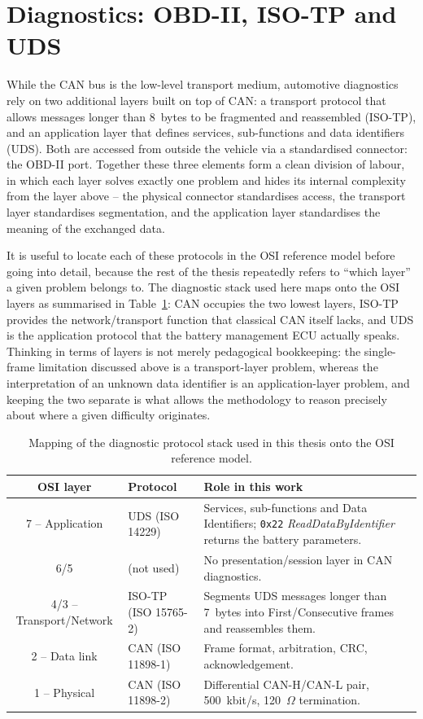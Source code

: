 \documentclass[11pt,a4paper,oneside,parskip=half]{scrreprt}
\providecommand{\hex}{}\renewcommand{\hex}[1]{\texttt{0x#1}}
\begin{document}
\section{Diagnostics: OBD-II, ISO-TP and UDS}
While the CAN bus is the low-level transport medium, automotive diagnostics rely on two additional layers built on top of CAN: a transport protocol that allows messages longer than 8~bytes to be fragmented and reassembled (ISO-TP), and an application layer that defines services, sub-functions and data identifiers (UDS). Both are accessed from outside the vehicle via a standardised connector: the OBD-II port. Together these three elements form a clean division of labour, in which each layer solves exactly one problem and hides its internal complexity from the layer above -- the physical connector standardises access, the transport layer standardises segmentation, and the application layer standardises the meaning of the exchanged data.

It is useful to locate each of these protocols in the OSI reference model before going into detail, because the rest of the thesis repeatedly refers to ``which layer'' a given problem belongs to. The diagnostic stack used here maps onto the OSI layers as summarised in Table~\ref{tab:osi_stack}: CAN occupies the two lowest layers, ISO-TP provides the network/transport function that classical CAN itself lacks, and UDS is the application protocol that the battery management ECU actually speaks. Thinking in terms of layers is not merely pedagogical bookkeeping: the single-frame limitation discussed above is a transport-layer problem, whereas the interpretation of an unknown data identifier is an application-layer problem, and keeping the two separate is what allows the methodology to reason precisely about where a given difficulty originates.

\begin{table}[H]
\caption{Mapping of the diagnostic protocol stack used in this thesis onto the OSI reference model.}
\label{tab:osi_stack}
\centering
\begin{tabular}{clp{6.6cm}}
\toprule
\textbf{OSI layer} & \textbf{Protocol} & \textbf{Role in this work} \\
\midrule
7 -- Application & UDS (ISO 14229)        & Services, sub-functions and Data Identifiers; \hex{22} \textit{ReadDataByIdentifier} returns the battery parameters. \\
6/5             & (not used)              & No presentation/session layer in CAN diagnostics. \\
4/3 -- Transport/Network & ISO-TP (ISO 15765-2) & Segments UDS messages longer than 7~bytes into First/Consecutive frames and reassembles them. \\
2 -- Data link  & CAN (ISO 11898-1)       & Frame format, arbitration, CRC, acknowledgement. \\
1 -- Physical   & CAN (ISO 11898-2)       & Differential CAN-H/CAN-L pair, 500~kbit/s, 120~$\Omega$ termination. \\
\bottomrule
\end{tabular}
\end{table}
\end{document}
